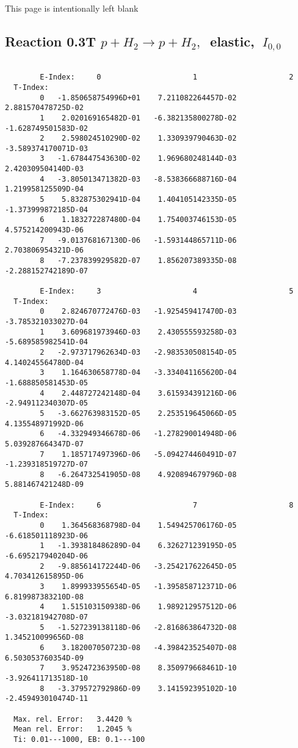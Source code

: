 \documentclass[12pt,dvipdfmx]{article}
\begin{document}
\newpage
This page is intentionally left blank
\newpage


\subsection{
Reaction 0.3T  $p + H_2 \rightarrow  p + H_2 ,\ $  elastic,
$\  I_{0,0}$
}

\begin{small}\begin{verbatim}

        E-Index:     0                     1                     2
  T-Index:
        0   -1.850658754996D+01    7.211082264457D-02    2.881570478725D-02
        1    2.020169165482D-01   -6.382135800278D-02   -1.628749501583D-02
        2    2.598024510290D-02    1.330939790463D-02   -3.589374170071D-03
        3   -1.678447543630D-02    1.969680248144D-03    2.420309504140D-03
        4   -3.805013471382D-03   -8.538366688716D-04    1.219958125509D-04
        5    5.832875302941D-04    1.404105142335D-05   -1.373999872185D-04
        6    1.183272287480D-04    1.754003746153D-05    4.575214200943D-06
        7   -9.013768167130D-06   -1.593144865711D-06    2.703806954321D-06
        8   -7.237839929582D-07    1.856207389335D-08   -2.288152742189D-07

        E-Index:     3                     4                     5
  T-Index:
        0    2.824670772476D-03   -1.925459417470D-03   -3.785321033027D-04
        1    3.609681973946D-03    2.430555593258D-03   -5.689585982541D-04
        2   -2.973717962634D-03   -2.983530508154D-05    4.140245564780D-04
        3    1.164630658778D-04   -3.334041165620D-04   -1.688850581453D-05
        4    2.448727242148D-04    3.615934391216D-06   -2.949112340307D-05
        5   -3.662763983152D-05    2.253519645066D-05    4.135548971992D-06
        6   -4.332949346678D-06   -1.278290014948D-06    5.039287664347D-07
        7    1.185717497396D-06   -5.094274460491D-07   -1.239318519727D-07
        8   -6.264732541905D-08    4.920894679796D-08    5.881467421248D-09

        E-Index:     6                     7                     8
  T-Index:
        0    1.364568368798D-04    1.549425706176D-05   -6.618501118923D-06
        1   -1.393818486289D-04    6.326271239195D-05   -6.695217940204D-06
        2   -9.885614172244D-06   -3.254217622645D-05    4.703412615895D-06
        3    1.899933955654D-05   -1.395858712371D-06    6.819987383210D-08
        4    1.515103150938D-06    1.989212957512D-06   -3.032181942708D-07
        5   -1.527239138118D-06   -2.816863864732D-08    1.345210099656D-08
        6    3.182007050723D-08   -4.398423525407D-08    6.503053760354D-09
        7    3.952472363950D-08    8.350979668461D-10   -3.926411713518D-10
        8   -3.379572792986D-09    3.141592395102D-10   -2.459493010474D-11

  Max. rel. Error:   3.4420 %
  Mean rel. Error:   1.2045 %
  Ti: 0.01---1000, EB: 0.1---100
\end{verbatim}\end{small}
\end{document}
